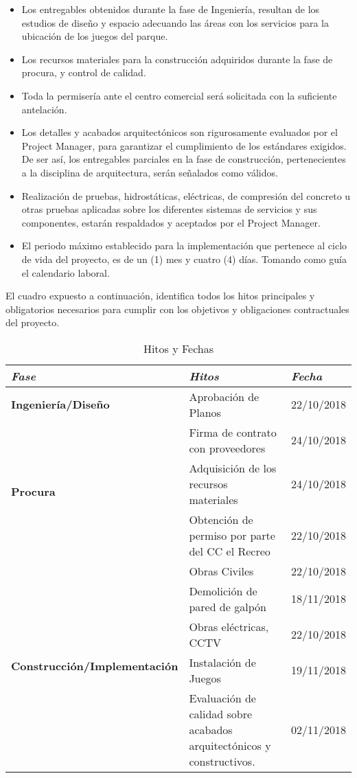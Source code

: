 \documentclass[11pt,a4paper,roman]{article}
\begin{document}
\begin{itemize}
	\item Los entregables obtenidos durante la fase de Ingeniería, resultan de los estudios de diseño y espacio adecuando las áreas con los servicios para la ubicación de los juegos del parque.
	\item Los recursos materiales para la construcción adquiridos durante la fase de procura, y control de calidad.
	\item Toda la permisería ante el centro comercial será solicitada con la suficiente antelación.
	\item Los detalles y acabados arquitectónicos son rigurosamente evaluados por el Project Manager, para garantizar el cumplimiento de los estándares exigidos. De ser así, los entregables parciales en la fase de construcción, pertenecientes a la disciplina de arquitectura, serán señalados como válidos.
	\item Realización de pruebas, hidrostáticas, eléctricas, de compresión del concreto u otras pruebas aplicadas sobre los diferentes sistemas de servicios y sus componentes, estarán respaldados y aceptados por el Project Manager.
	\item El periodo máximo establecido para la implementación  que pertenece al ciclo de vida del proyecto, es de un (1) mes  y cuatro (4) días. Tomando como guía el calendario laboral.
\end{itemize}

\noindent
El cuadro expuesto a continuación, identifica todos los hitos principales y obligatorios necesarios para cumplir con los objetivos y obligaciones contractuales del proyecto.

\begin{table}[h]
	
\caption{Hitos y Fechas}
\label{tab:cuadro3}	

\begin{tabular}{|p{6cm}|p{6cm}|p{3cm}|}
	\hline \textbf{\textit{Fase}} & \textbf{\textit{Hitos}} & \textbf{\textit{Fecha}}\\
	\hline \textbf{Ingeniería/Diseño} & Aprobación de Planos & 22/10/2018\\
	\hline 
	\multirow{3}{*}{\textbf{Procura}} & {Firma de contrato con proveedores} & {24/10/2018} \\\cline{2-3}
	& {Adquisición de los recursos materiales} & {24/10/2018} \\\cline{2-3}
	& {Obtención de permiso por parte del CC el Recreo} & {22/10/2018} \\\cline{2-3}
	\hline
	\multirow{5}{*}{\textbf{Construcción/Implementación}} & {Obras Civiles} & {22/10/2018} \\\cline{2-3}
	& {Demolición de pared de galpón} & {18/11/2018} \\\cline{2-3}
	& {Obras eléctricas, CCTV} & {22/10/2018} \\\cline{2-3}
	&{Instalación de Juegos} & {19/11/2018} \\\cline{2-3}
	&{Evaluación de calidad sobre acabados arquitectónicos y constructivos.} & {02/11/2018} \\\hline
\end{tabular}

\end{table}
\end{document}
